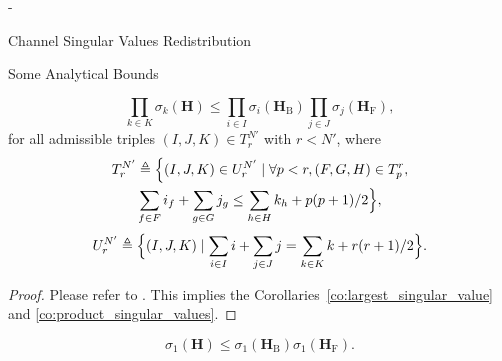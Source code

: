 \begin{section}{-}
\begin{subsection}{Channel Singular Values Redistribution}
\begin{subsubsection}{Some Analytical Bounds}
			\begin{corollary}
				\begin{equation}
					\prod_{k \in {K}} \sigma_k(\mathbf{H}) \le \prod_{i \in {I}} \sigma_i(\mathbf{H}_\mathrm{B}) \prod_{j \in {J}} \sigma_j(\mathbf{H}_\mathrm{F}),
					\label{iq:sv_bound_fc}
				\end{equation}
				for all admissible triples $(I, J, K) \in T_r^{N'}$ with $r < N'$, where
				\begin{equation*}
					\begin{gathered}
						T_r^{N'} \triangleq \Bigl\{(I, J, K) \in U_r^{N'} \mid \forall p < r, (F, G, H) \in T_p^r,\\
						\sum_{f \in F} i_f + \sum_{g \in G} j_g \le \sum_{h \in H} k_h + p(p+1)/2 \Bigr\},
					\end{gathered}
				\end{equation*}
				\begin{equation*}
					U_r^{N'} \triangleq \Bigl\{(I, J, K) \mid \sum_{i \in I} i + \sum_{j \in J} j = \sum_{k \in K} k + r(r+1)/2\Bigr\}.
				\end{equation*}
			\end{corollary}
			\begin{proof}
				Please refer to \cite[Theorem 8]{Fulton2000}. This implies the Corollaries~\ref{co:largest_singular_value} and \ref{co:product_singular_values}.
			\end{proof}

			\begin{corollary}\label{co:largest_singular_value}
				\begin{equation}
					\sigma_1(\mathbf{H}) \le \sigma_1(\mathbf{H}_\mathrm{B}) \sigma_1(\mathbf{H}_\mathrm{F}).
				\end{equation}
			\end{corollary}



\end{subsubsection}
\end{subsection}
\end{section}
